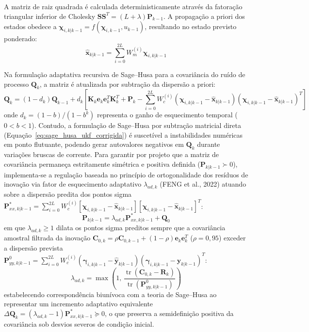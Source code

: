 A matriz de raiz quadrada é calculada deterministicamente através da fatoração triangular inferior de Cholesky $\mathbf{S}\mathbf{S}^T = (L + \lambda)\mathbf{P}_{k-1}$. A propagação a priori dos estados obedece a $\boldsymbol{\chi}_{i, k|k-1} = f(\boldsymbol{\chi}_{i, k-1}, u_{k-1})$, resultando no estado previsto ponderado:
\begin{equation}
    \hat{\mathbf{x}}_{k|k-1} = \sum_{i=0}^{2L} W_m^{(i)} \boldsymbol{\chi}_{i, k|k-1}
\end{equation}

Na formulação adaptativa recursiva de Sage--Husa para a covariância do ruído de processo $\mathbf{Q}_k$, a matriz é atualizada por subtração da dispersão a priori:
\begin{equation}
    \mathbf{Q}_k = (1 - d_k)\mathbf{Q}_{k-1} + d_k \left[ \mathbf{K}_k \mathbf{e}_k \mathbf{e}_k^T \mathbf{K}_k^T + \mathbf{P}_k - \sum_{i=0}^{2L} W_c^{(i)} \left(\boldsymbol{\chi}_{i, k|k-1} - \hat{\mathbf{x}}_{k|k-1}\right)\left(\boldsymbol{\chi}_{i, k|k-1} - \hat{\mathbf{x}}_{k|k-1}\right)^T \right]
    \label{eq:sage_husa_ukf_corrigida}
\end{equation}
onde $d_k = (1 - b)/(1 - b^k)$ representa o ganho de esquecimento temporal ($0 < b < 1$). Contudo, a formulação de Sage--Husa por subtração matricial direta (Equação~\ref{eq:sage_husa_ukf_corrigida}) é suscetível a instabilidades numéricas em ponto flutuante, podendo gerar autovalores negativos em $\mathbf{Q}_k$ durante variações bruscas de corrente. Para garantir por projeto que a matriz de covariância permaneça estritamente simétrica e positiva definida ($\mathbf{P}_{k|k-1} \succ 0$), implementa-se a regulação baseada no princípio de ortogonalidade dos resíduos de inovação via fator de esquecimento adaptativo $\lambda_{ad,k}$ (FENG et al., 2022) atuando sobre a dispersão predita dos pontos sigma $\mathbf{P}_{xx, k|k-1}^* = \sum_{i=0}^{2L} W_c^{(i)} [\boldsymbol{\chi}_{i, k|k-1} - \hat{\mathbf{x}}_{k|k-1}][\boldsymbol{\chi}_{i, k|k-1} - \hat{\mathbf{x}}_{k|k-1}]^T$:
\begin{equation}
    \mathbf{P}_{k|k-1} = \lambda_{ad,k} \mathbf{P}_{xx, k|k-1}^* + \mathbf{Q}_0
    \label{eq:aukf_fading_sigma}
\end{equation}
em que $\lambda_{ad,k} \ge 1$ dilata os pontos sigma preditos sempre que a covariância amostral filtrada da inovação $\mathbf{C}_{0,k} = \rho \mathbf{C}_{0,k-1} + (1 - \rho) \mathbf{e}_k \mathbf{e}_k^T$ ($\rho = 0{,}95$) exceder a dispersão prevista $\mathbf{P}_{yy, k|k-1}^0 = \sum_{i=0}^{2L} W_c^{(i)} (\boldsymbol{\gamma}_{i, k|k-1} - \hat{\mathbf{y}}_{k|k-1})(\boldsymbol{\gamma}_{i, k|k-1} - \hat{\mathbf{y}}_{k|k-1})^T$:
\begin{equation}
    \lambda_{ad,k} = \max\left( 1, \, \frac{\operatorname{tr}\left(\mathbf{C}_{0,k} - \mathbf{R}_k\right)}{\operatorname{tr}\left(\mathbf{P}_{yy, k|k-1}^0\right)} \right)
    \label{eq:lambda_ad_aukf}
\end{equation}
estabelecendo correspondência biunívoca com a teoria de Sage--Husa ao representar um incremento adaptativo equivalente $\Delta \mathbf{Q}_k = (\lambda_{ad,k} - 1)\mathbf{P}_{xx, k|k-1}^* \succeq 0$, o que preserva a semidefinição positiva da covariância sob desvios severos de condição inicial.

